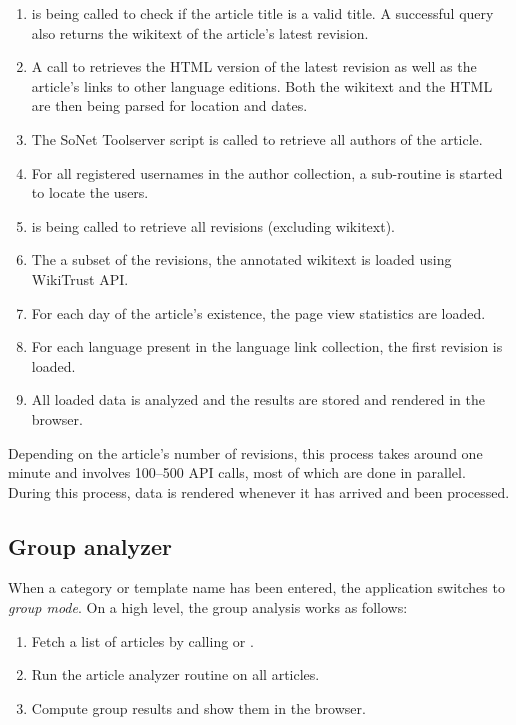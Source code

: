 \begin{enumerate}
	\item {} is being called to check if the article title is a valid title. 
	A successful query also returns the wikitext of the article's latest revision.
	\item A call to  retrieves the \ac{HTML} version of the latest revision as well as the article's links to other language editions. 
	Both the wikitext and the \ac{HTML} are then being parsed for location and dates.
	\item The SoNet Toolserver script is called to retrieve all authors of the article.
	\item For all registered usernames in the author collection, a sub-routine is started to locate the users. 
	\item {} is being called to retrieve all revisions (excluding wikitext). 
	\item The a subset of the revisions, the annotated wikitext is loaded using WikiTrust \ac{API}.
	\item For each day of the article's existence, the page view statistics are loaded.
	\item For each language present in the language link collection, the first revision is loaded.
	\item All loaded data is analyzed and the results are stored and rendered in the browser.
\end{enumerate}

Depending on the article's number of revisions, this process takes around one minute and involves 100--500 \ac{API} calls, most of which are done in parallel. 
During this process, data is rendered whenever it has arrived and been processed.

\subsection{Group analyzer}

When a category or template name has been entered, the application switches to \emph{group mode}.
On a high level, the group analysis works as follows:

\begin{enumerate}
    \item Fetch a list of articles by calling  or .
    \item Run the article analyzer routine on all articles.
    \item Compute group results and show them in the browser.
\end{enumerate}

